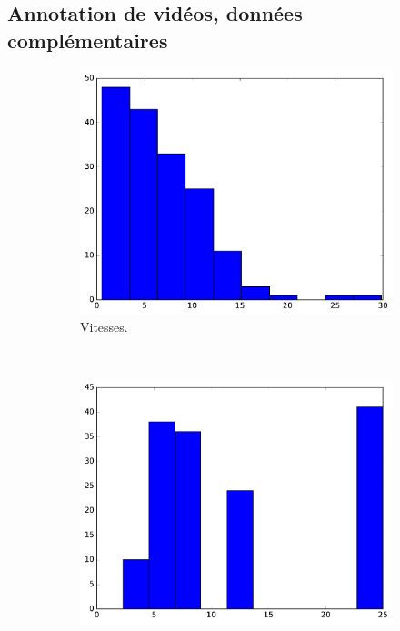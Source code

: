 \begin{appendices}
\section{Annotation de vidéos, données complémentaires}


	\begin{figure}[htbp]
		\begin{subfigure}[t]{\subImgWclicks}
			\centering
			\includegraphics[width=\textwidth]{figures/ch3/concordeA_filteredSpeed}
			\caption{Vitesses.}
			\label{fig:concordeA_filteredSpeed}
		\end{subfigure}
		~
		\begin{subfigure}[t]{\subImgWclicks}
			\centering
			\includegraphics[width=\textwidth]{figures/ch3/concordeA_frequency}

\end{subfigure}
\end{figure}
\end{appendices}
